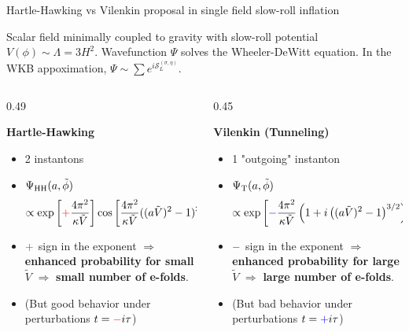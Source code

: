 \documentclass[aspectratio=169,smaller]{beamer}%
\begin{document}
\begin{frame}{Hartle-Hawking vs Vilenkin proposal in single field slow-roll inflation}
	\begin{block}{}
		Scalar field minimally coupled to gravity with slow-roll potential $V(\phi)\sim \Lambda=3H^2$.
		Wavefunction $\Psi$ solves the Wheeler-DeWitt equation. In the WKB appoximation, $\Psi \sim \sum e^{i \mathcal{S}_L^{(\sigma,\eta)}}$.
		\vspace{-0.15cm}
	\begin{columns}
		\begin{column}{0.49\textwidth}
				\begin{block}{}
					\textbf{Hartle-Hawking}
					\begin{itemize}
						\item 2 instantons
						\item $\Psi_{\rm HH}(a,\tilde{\phi}) $ \begin{equation*}
						\propto \exp\left[{\color{red}+}\frac{4\pi^2}{\kappa \tilde{V}}\right]\cos\left[\frac{4\pi^2}{\kappa \tilde{V}}((a \tilde{V})^2-1)^{3/2}-\frac{\pi}{4}\right]\,.
					\end{equation*}
					\item $\color{red}+$ sign in the exponent $\Rightarrow$ \textbf{enhanced probability for small $\tilde{V}$} $\Rightarrow$ \textbf{small number of e-folds}.
					\item (But good behavior under perturbations $t = {\color{red}-}i \tau$)
					\end{itemize}
				\end{block}

		\end{column}
		\begin{column}{0.45\textwidth}
				\begin{block}{}
					\textbf{Vilenkin (Tunneling)}
					\begin{itemize}
						\item 1 "outgoing" instanton
						\item $\Psi_{\rm T}(a,\tilde{\phi}) $ \begin{equation*}
						\propto \exp\left[{\color{blue}-}\frac{4\pi^2}{\kappa \tilde{V}}\left(1+i\left((a\tilde{V})^2-1\right)^{3/2}\right)\right]\,.
					\end{equation*}
					\item $\color{blue}-$ sign in the exponent $\Rightarrow$ \textbf{enhanced probability for large $\tilde{V}$} $\Rightarrow$ \textbf{large number of e-folds}.
					\item (But bad behavior under perturbations $t = {\color{blue}+}i\tau$)
					\end{itemize}
				\end{block}
			
		\end{column}
	\end{columns}
	\end{block}
\end{frame}
\end{document}
